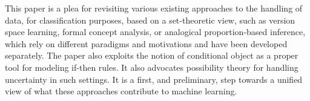 
This  paper is a plea for revisiting various existing approaches to the handling of data, for classification purposes, based on a set-theoretic view, such as version space learning, formal concept analysis, or analogical proportion-based inference, which rely on different paradigms and motivations and have been developed separately. The paper also exploits the notion of conditional object as a proper tool for 
modeling if-then rules. It also advocates possibility theory for handling uncertainty in such settings. 
It is a first, and preliminary, step towards a unified view of what these approaches contribute to machine learning. \\


